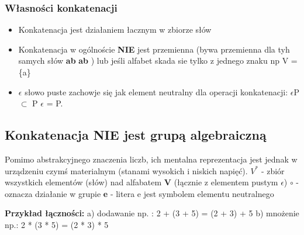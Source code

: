 	\subsubsection{Własności konkatenacji}
		\begin{itemize}
		  \item Konkatenacja jest działaniem łacznym w zbiorze słów
		  
		  \item Konkatenacja w ogólnoście {\bf NIE} jest przemienna 
		  (bywa przemienna dla tyh samych słów {\bf ab} {\bf ab } ) lub 
		  jeśli alfabet skada sie tylko z jednego znaku np V = \{a\}
		  
		  \item $\epsilon$ słowo puste zachowje się jak element neutralny 
		  dla operacji konkatenacji: \newline $\epsilon$P $\subset$ P $\epsilon$ = P.
		\end{itemize}
	
	
	\subsection{Konkatenacja NIE jest grupą algebraiczną}
		Pomimo abstrakcyjnego znaczenia liczb, ich mentalna reprezentacja jest jednak w 
		urządzeniu czymś materialnym (stanami wysokich i niskich napięć).\newline \newline
		$V^{*}$ - zbiór wszystkich elementów (słów) nad alfabatem { \bf V} 
		(łącznie z elementem pustym $\epsilon$) \newline
		$\circ$ - oznacza działanie w grupie \newline				
		\textbf{e} - litera e jest symbolem elementu neutralnego \newline
		
		
		\begin{tcolorbox}
			\textbf{Przykład łączności:} \newline
			a) dodawanie np. : 2 + (3 + 5) = (2 + 3) + 5 \newline
			b) mnożenie np.:  2 * (3 * 5) = (2 * 3) * 5
		\end{tcolorbox}
		
